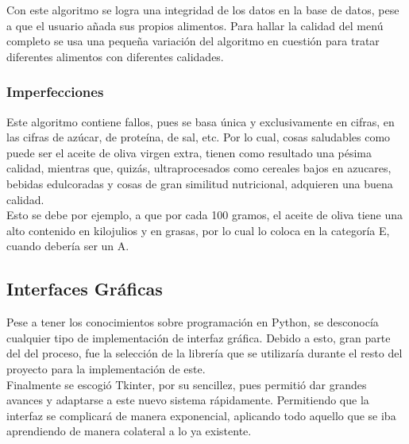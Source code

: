 
Con este algoritmo se logra una integridad de los datos en la base de datos, pese a que el usuario añada sus propios alimentos. Para hallar la calidad del menú completo se usa una pequeña variación del algoritmo en cuestión para tratar diferentes alimentos con diferentes calidades.
\subsubsection{Imperfecciones}
Este algoritmo contiene fallos, pues se basa única y exclusivamente en cifras, en las cifras de azúcar, de proteína, de sal, etc. Por lo cual, cosas saludables como puede ser el aceite de oliva virgen extra, tienen como resultado una pésima calidad, mientras que, quizás, ultraprocesados como cereales bajos en azucares, bebidas edulcoradas y cosas de gran similitud nutricional, adquieren una buena calidad. \\
Esto se debe por ejemplo, a que por cada 100 gramos, el aceite de oliva tiene una alto contenido en kilojulios y en grasas, por lo cual lo coloca en la categoría E, cuando debería ser un A.
\subsection{Interfaces Gráficas}
Pese a tener los conocimientos sobre programación en Python, se desconocía cualquier tipo de implementación de interfaz gráfica. Debido a esto, gran parte del  del proceso, fue la selección de la librería que se utilizaría durante el resto del proyecto para la implementación de este.\\
Finalmente se escogió Tkinter, por su sencillez, pues permitió dar grandes avances y adaptarse a este nuevo sistema rápidamente. Permitiendo que la interfaz se complicará de manera exponencial, aplicando todo aquello que se iba aprendiendo de manera colateral a lo ya existente.
